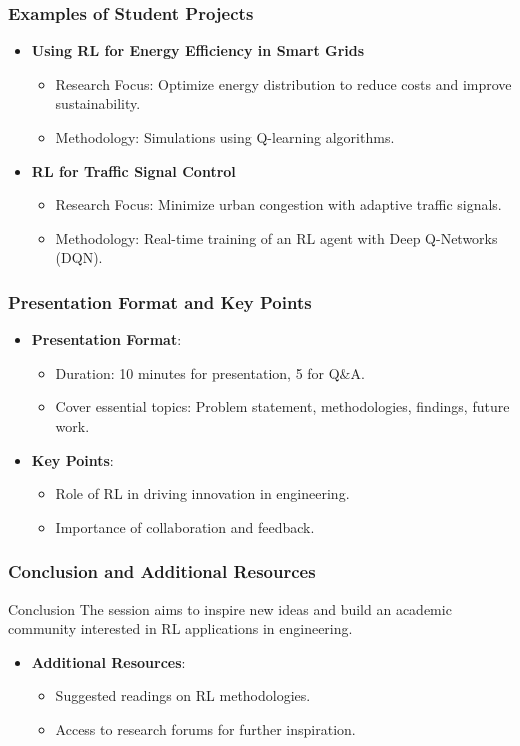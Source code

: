 \documentclass[aspectratio=169]{beamer}
\begin{document}
\begin{frame}[fragile]
  \frametitle{Examples of Student Projects}
  \begin{itemize}
    \item \textbf{Using RL for Energy Efficiency in Smart Grids}
      \begin{itemize}
        \item Research Focus: Optimize energy distribution to reduce costs and improve sustainability.
        \item Methodology: Simulations using Q-learning algorithms.
      \end{itemize}
    \item \textbf{RL for Traffic Signal Control}
      \begin{itemize}
        \item Research Focus: Minimize urban congestion with adaptive traffic signals.
        \item Methodology: Real-time training of an RL agent with Deep Q-Networks (DQN).
      \end{itemize}
  \end{itemize}
\end{frame}

\begin{frame}[fragile]
  \frametitle{Presentation Format and Key Points}
  \begin{itemize}
    \item \textbf{Presentation Format}:
      \begin{itemize}
        \item Duration: 10 minutes for presentation, 5 for Q&A.
        \item Cover essential topics: Problem statement, methodologies, findings, future work.
      \end{itemize}
    \item \textbf{Key Points}:
      \begin{itemize}
        \item Role of RL in driving innovation in engineering.
        \item Importance of collaboration and feedback.
      \end{itemize}
  \end{itemize}
\end{frame}

\begin{frame}[fragile]
  \frametitle{Conclusion and Additional Resources}
  \begin{block}{Conclusion}
    The session aims to inspire new ideas and build an academic community interested in RL applications in engineering.
  \end{block}
  \begin{itemize}
    \item \textbf{Additional Resources}:
      \begin{itemize}
        \item Suggested readings on RL methodologies.
        \item Access to research forums for further inspiration.
      \end{itemize}
  \end{itemize}
\end{frame}
\end{document}

